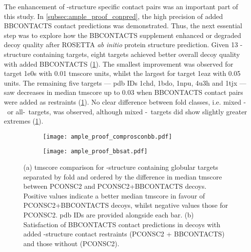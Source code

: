 The enhancement of \textbeta-structure specific contact pairs was an important part of this study. In \cref{subsec:ample_proof_conpred}, the high precision of added BBCONTACTS contact predictions was demonstrated. Thus, the next essential step was to explore how the BBCONTACTS supplement enhanced or degraded decoy quality after ROSETTA \textit{ab initio} protein structure prediction. Given 13 \textbeta-structure containing targets, eight targets achieved better overall decoy quality with added BBCONTACTS (\cref{fig:ample_proof_comprosconbb}). The smallest improvement was observed for target 1e0s with 0.01 \gls{tmscore} units, whilst the largest for target 1eaz with 0.05 units. The remaining five targets --- \gls{pdb} IDs 1chd, 1bdo, 1npu, 4u3h and 1tjx --- saw decreases in median \gls{tmscore} up to 0.03 when BBCONTACTS contact pairs were added as restraints (\cref{fig:ample_proof_comprosconbb}). No clear difference between fold classes, i.e. mixed \textalpha-\textbeta\ or all-\textbeta\ targets, was observed, although mixed \textalpha-\textbeta\ targets did show slightly greater extremes (\cref{fig:ample_proof_comprosconbb}).

\begin{figure}[H]
    \centering
    \begin{subfigure}[b]{\textwidth}
        \centering
        \texttt{[image: ample\_proof\_comprosconbb.pdf]}
        \caption{}
        \label{fig:ample_proof_comprosconbb}
    \end{subfigure}
    
    \begin{subfigure}[b]{\textwidth}
        \centering
        \texttt{[image: ample\_proof\_bbsat.pdf]}
        \caption{}
        \label{fig:ample_proof_bbsat}
    \end{subfigure}
    
    \caption[Decoy analysis of effects of BBCONTACTS contact addition]{(a) \Gls{tmscore} comparison for \textbeta-structure containing globular targets separated by fold and ordered by the difference in median \gls{tmscore} between PCONSC2 and PCONSC2+BBCONTACTS decoys. Positive values indicate a better median \gls{tmscore} in favour of PCONSC2+BBCONTACTS decoys, whilst negative values those for PCONSC2. \Gls{pdb} IDs are provided alongside each bar. (b) Satisfaction of BBCONTACTS contact predictions in decoys with added \textbeta-structure contact restraints (PCONSC2 + BBCONTACTS) and those without (PCONSC2).}
\end{figure}


